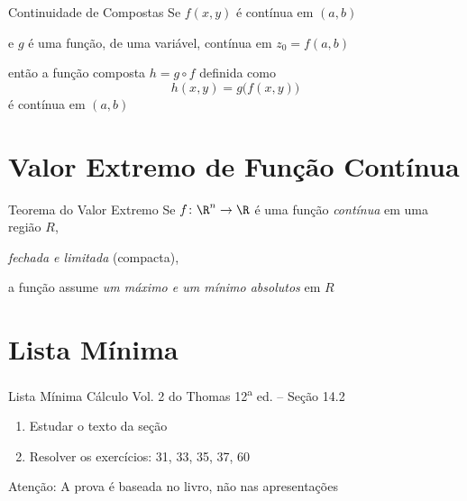 \documentclass[fleqn,utf8,aspectratio=169,12pt]{beamer}
\begin{document}


\begin{frame}{Continuidade de Compostas}
  Se $f(x, y)$ é contínua em $(a, b)$

  \pause
  e $g$ é uma função, de uma variável, contínua em $z_0 = f(a, b)$

  \pause
  então a função composta
  \(
    h = g\circ f
  \)
  \pause
  definida como
  \[
    h(x, y) = g\big(f(x, y)\big)
  \]
  \pause
  é contínua em $(a, b)$
\end{frame}



\section{Valor Extremo de Função Contínua}

\begin{frame}{Teorema do Valor Extremo}
  Se \(f\colon\R^n\to\R\) é uma função \emph{contínua}
  em uma região $R$,

  \pause
  \emph{fechada e limitada} (compacta),

  \pause
  a função assume \emph{um máximo e um mínimo absolutos} em $R$
\end{frame}

\section{Lista Mínima}

\begin{frame}{Lista Mínima}
  Cálculo Vol. 2 do Thomas 12\textsuperscript{a} ed. -- Seção 14.2
  \begin{enumerate}
    \item Estudar o texto da seção
    \item Resolver os exercícios: 31, 33, 35, 37, 60
  \end{enumerate}

  \vfill
  Atenção: A prova é baseada no livro, não nas apresentações
\end{frame}

\end{document}
